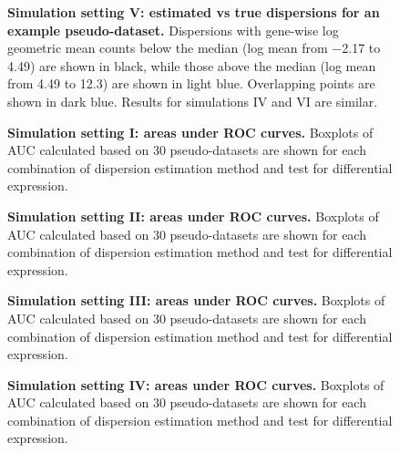 \documentclass[10pt]{article}
\begin{document}
\begin{figure}[!ht] %
   \centering
 \caption{{\bf \color{blue} Simulation setting V: estimated vs true dispersions for an example pseudo-dataset.} \color{blue} Dispersions with gene-wise log geometric mean counts below the median (log mean from $-$2.17 to 4.49) are shown in black, %
 while those above the median (log mean from 4.49 to 12.3) are shown in light blue. %
   Overlapping points are shown in dark blue. %
 Results for simulations IV and VI are similar.}
   \label{fig:pp5}
\end{figure}


\begin{figure}[!ht] %
   \centering
   \caption{{\bf Simulation setting I: areas under ROC curves.} Boxplots of AUC calculated based on 30 pseudo-datasets are shown for each combination of dispersion estimation method and test for differential expression.} %
   \label{fig:auc1}
\end{figure}

\begin{figure}[!ht] %
   \centering
   \caption{{\bf Simulation setting II: areas under ROC curves.} Boxplots of AUC calculated based on 30 pseudo-datasets are shown for each combination of dispersion estimation method and test for differential expression.} %
   \label{fig:auc2}
\end{figure}

\begin{figure}[!ht] %
   \centering
   \caption{{\bf Simulation setting III: areas under ROC curves.} Boxplots of AUC calculated based on 30 pseudo-datasets are shown for each combination of dispersion estimation method and test for differential expression.} %
   \label{fig:auc3}
\end{figure}

\begin{figure}[!ht] %
   \centering
   \caption{{\bf Simulation setting IV: areas under ROC curves.} Boxplots of AUC calculated based on 30 pseudo-datasets are shown for each combination of dispersion estimation method and test for differential expression.} %
   \label{fig:auc4}
\end{figure}
\end{document}
